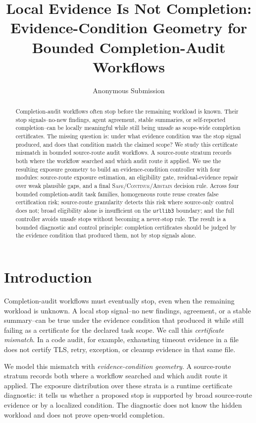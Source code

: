 \documentclass[letterpaper,10pt,twocolumn]{article}
\title{Local Evidence Is Not Completion:\\ Evidence-Condition Geometry for Bounded Completion-Audit Workflows}
\author{Anonymous Submission}
\date{}
\newcommand{\safe}{\textsc{Safe}}
\newcommand{\cont}{\textsc{Continue}}
\newcommand{\abstain}{\textsc{Abstain}}
\begin{document}
\maketitle

\begin{abstract}
Completion-audit workflows often stop before the remaining workload is known.
Their stop signals--no-new findings, agent agreement, stable summaries, or
self-reported completion--can be locally meaningful while still being unsafe as
scope-wide completion certificates. The missing question is: under what evidence
condition was the stop signal produced, and does that condition match the
claimed scope? We study this certificate mismatch in bounded source-route audit
workflows. A source-route stratum records both where the workflow searched and
which audit route it applied. We use the resulting exposure geometry to build an
evidence-condition controller with four modules: source-route exposure
estimation, an eligibility gate, residual-evidence repair over weak plausible
gaps, and a final \safe{}/\cont{}/\abstain{} decision rule. Across four bounded
completion-audit task families, homogeneous route reuse creates false
certification risk; source-route granularity detects this risk where source-only
control does not; broad eligibility alone is insufficient on the
\texttt{urllib3} boundary; and the full controller avoids unsafe stops without
becoming a never-stop rule. The result is a bounded diagnostic and control
principle: completion certificates should be judged by the evidence condition
that produced them, not by stop signals alone.
\end{abstract}

\section{Introduction}

Completion-audit workflows must eventually stop, even when the remaining
workload is unknown. A local stop signal--no new findings, agreement, or a
stable summary--can be true under the evidence condition that produced it while
still failing as a certificate for the declared task scope. We call this
\emph{certificate mismatch}. In a code audit, for example, exhausting timeout
evidence in a file does not certify TLS, retry, exception, or cleanup evidence
in that same file.

We model this mismatch with \emph{evidence-condition geometry}. A source-route
stratum records both where a workflow searched and which audit route it applied.
The exposure distribution over these strata is a runtime certificate diagnostic:
it tells us whether a proposed stop is supported by broad source-route evidence
or by a localized condition. The diagnostic does not know the hidden workload and
does not prove open-world completion.
\end{document}
